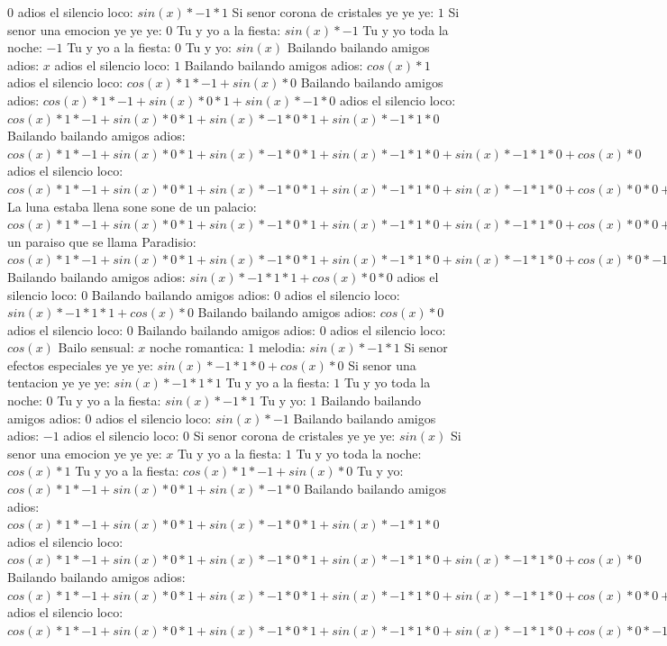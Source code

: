 \documentclass{article}
\begin{document}
$0$  \newline adios el silencio loco: $sin(x)*-1*1$ Si senor corona de cristales ye ye ye: $1$ Si senor una emocion ye ye ye: $0$  \newline Tu y yo a la fiesta: $sin(x)*-1$ Tu y yo toda la noche: $-1$ Tu y yo a la fiesta: $0$  \newline Tu y yo: $sin(x)$  \newline Bailando bailando amigos adios: $x$ adios el silencio loco: $1$  \newline Bailando bailando amigos adios: $cos(x)*1$ adios el silencio loco: $cos(x)*1*-1+sin(x)*0$ Bailando bailando amigos adios: ${cos(x)*1*-1+sin(x)*0}*1+sin(x)*-1*0$ adios el silencio loco: ${{cos(x)*1*-1+sin(x)*0}*1+sin(x)*-1*0}*1+sin(x)*-1*1*0$ Bailando bailando amigos adios: ${{cos(x)*1*-1+sin(x)*0}*1+sin(x)*-1*0}*1+sin(x)*-1*1*0+sin(x)*-1*1*0+cos(x)*0$ adios el silencio loco: ${{{cos(x)*1*-1+sin(x)*0}*1+sin(x)*-1*0}*1+sin(x)*-1*1*0+sin(x)*-1*1*0+cos(x)*0}*0+{sin(x)*-1*1*1+cos(x)*0}*0$ La luna estaba llena sone sone de un palacio: ${{{cos(x)*1*-1+sin(x)*0}*1+sin(x)*-1*0}*1+sin(x)*-1*1*0+sin(x)*-1*1*0+cos(x)*0}*0+{sin(x)*-1*1*1+cos(x)*0}*0+{sin(x)*-1*1*1+cos(x)*0}*0+cos(x)*1*0$ un paraiso que se llama Paradisio: ${{{cos(x)*1*-1+sin(x)*0}*1+sin(x)*-1*0}*1+sin(x)*-1*1*0+sin(x)*-1*1*0+cos(x)*0}*-1+{sin(x)*-1*1*1+cos(x)*0}*0$  \newline Bailando bailando amigos adios: ${sin(x)*-1*1*1+cos(x)*0}*0$ adios el silencio loco: $0$ Bailando bailando amigos adios: $0$  \newline adios el silencio loco: $sin(x)*-1*1*1+cos(x)*0$  \newline Bailando bailando amigos adios: $cos(x)*0$ adios el silencio loco: $0$ Bailando bailando amigos adios: $0$  \newline adios el silencio loco: $cos(x)$  \newline Bailo sensual: $x$ noche romantica: $1$  \newline melodia: $sin(x)*-1*1$ Si senor efectos especiales ye ye ye: $sin(x)*-1*1*0+cos(x)*0$ Si senor una tentacion ye ye ye: $sin(x)*-1*1*1$ Tu y yo a la fiesta: $1$ Tu y yo toda la noche: $0$  \newline Tu y yo a la fiesta: $sin(x)*-1*1$ Tu y yo: $1$ Bailando bailando amigos adios: $0$  \newline adios el silencio loco: $sin(x)*-1$ Bailando bailando amigos adios: $-1$ adios el silencio loco: $0$  \newline Si senor corona de cristales ye ye ye: $sin(x)$  \newline Si senor una emocion ye ye ye: $x$ Tu y yo a la fiesta: $1$  \newline Tu y yo toda la noche: $cos(x)*1$ Tu y yo a la fiesta: $cos(x)*1*-1+sin(x)*0$ Tu y yo: ${cos(x)*1*-1+sin(x)*0}*1+sin(x)*-1*0$ Bailando bailando amigos adios: ${{cos(x)*1*-1+sin(x)*0}*1+sin(x)*-1*0}*1+sin(x)*-1*1*0$ adios el silencio loco: ${{cos(x)*1*-1+sin(x)*0}*1+sin(x)*-1*0}*1+sin(x)*-1*1*0+sin(x)*-1*1*0+cos(x)*0$ Bailando bailando amigos adios: ${{{cos(x)*1*-1+sin(x)*0}*1+sin(x)*-1*0}*1+sin(x)*-1*1*0+sin(x)*-1*1*0+cos(x)*0}*0+{sin(x)*-1*1*1+cos(x)*0}*0$ adios el silencio loco: ${{{cos(x)*1*-1+sin(x)*0}*1+sin(x)*-1*0}*1+sin(x)*-1*1*0+sin(x)*-1*1*0+cos(x)*0}*-1$ 
\end{document}
